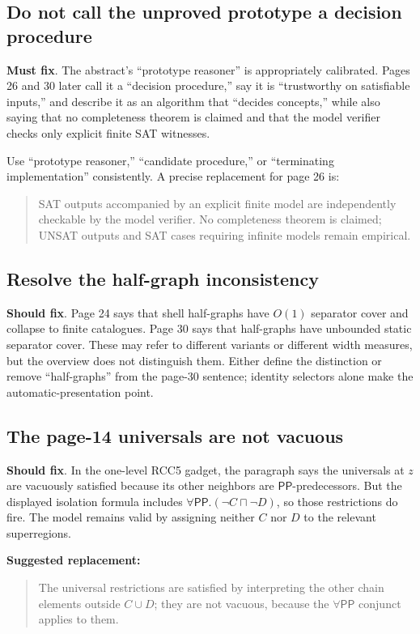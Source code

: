 \documentclass[11pt]{article}
\newcommand{\PP}{\ensuremath{\mathsf{PP}}}
\newcommand{\mustfix}{\textcolor{reviewred}{\textbf{Must fix}}}
\newcommand{\shouldfix}{\textcolor{reviewamber}{\textbf{Should fix}}}
\begin{document}
\subsection{Do not call the unproved prototype a decision procedure}

\mustfix. The abstract's ``prototype reasoner'' is appropriately calibrated. Pages 26 and 30 later call it a ``decision procedure,'' say it is ``trustworthy on satisfiable inputs,'' and describe it as an algorithm that ``decides concepts,'' while also saying that no completeness theorem is claimed and that the model verifier checks only explicit finite SAT witnesses.

Use ``prototype reasoner,'' ``candidate procedure,'' or ``terminating implementation'' consistently. A precise replacement for page 26 is:
\begin{quote}
SAT outputs accompanied by an explicit finite model are independently checkable by the model verifier. No completeness theorem is claimed; UNSAT outputs and SAT cases requiring infinite models remain empirical.
\end{quote}

\subsection{Resolve the half-graph inconsistency}

\shouldfix. Page 24 says that shell half-graphs have \(O(1)\) separator cover and collapse to finite catalogues. Page 30 says that half-graphs have unbounded static separator cover. These may refer to different variants or different width measures, but the overview does not distinguish them. Either define the distinction or remove ``half-graphs'' from the page-30 sentence; identity selectors alone make the automatic-presentation point.

\subsection{The page-14 universals are not vacuous}

\shouldfix. In the one-level RCC5 gadget, the paragraph says the universals at \(z\) are vacuously satisfied because its other neighbors are \(\PP\)-predecessors. But the displayed isolation formula includes \(\forall\PP.(\neg C\sqcap\neg D)\), so those restrictions do fire. The model remains valid by assigning neither \(C\) nor \(D\) to the relevant superregions.

\textbf{Suggested replacement:}
\begin{quote}
The universal restrictions are satisfied by interpreting the other chain elements outside \(C\cup D\); they are not vacuous, because the \(\forall\PP\) conjunct applies to them.
\end{quote}
\end{document}
